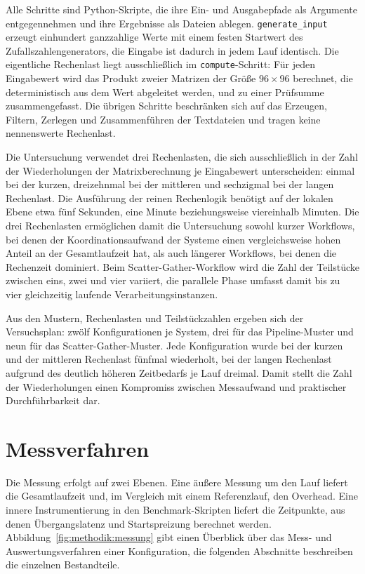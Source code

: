 Alle Schritte sind Python-Skripte, die ihre Ein- und Ausgabepfade
als Argumente entgegennehmen und ihre Ergebnisse als Dateien
ablegen. \texttt{generate\_input} erzeugt einhundert ganzzahlige
Werte mit einem festen Startwert des Zufallszahlengenerators, die
Eingabe ist dadurch in jedem Lauf identisch. Die eigentliche
Rechenlast liegt ausschließlich im \texttt{compute}-Schritt: Für
jeden Eingabewert wird das Produkt zweier Matrizen der Größe
$96 \times 96$ berechnet, die deterministisch aus dem Wert
abgeleitet werden, und zu einer Prüfsumme zusammengefasst. Die
übrigen Schritte beschränken sich auf das Erzeugen, Filtern,
Zerlegen und Zusammenführen der Textdateien und tragen keine
nennenswerte Rechenlast.

Die Untersuchung verwendet drei Rechenlasten, die sich
ausschließlich in der Zahl der Wiederholungen der Matrixberechnung
je Eingabewert unterscheiden: einmal bei der kurzen, dreizehnmal
bei der mittleren und sechzigmal bei der langen Rechenlast. Die
Ausführung der reinen Rechenlogik benötigt auf der lokalen Ebene
etwa fünf Sekunden, eine Minute beziehungsweise viereinhalb
Minuten. Die drei Rechenlasten ermöglichen damit die Untersuchung
sowohl kurzer Workflows, bei denen der Koordinationsaufwand der
Systeme einen vergleichsweise hohen Anteil an der Gesamtlaufzeit
hat, als auch längerer Workflows, bei denen die Rechenzeit
dominiert. Beim Scatter-Gather-Workflow wird die Zahl der
Teilstücke zwischen eins, zwei und vier variiert, die parallele
Phase umfasst damit bis zu vier gleichzeitig laufende
Verarbeitungsinstanzen.

Aus den Mustern, Rechenlasten und Teilstückzahlen ergeben sich der
Versuchsplan: zwölf Konfigurationen je System, drei für das Pipeline-Muster und neun für das Scatter-Gather-Muster. Jede Konfiguration wurde bei der kurzen und der mittleren Rechenlast fünfmal wiederholt, bei der langen Rechenlast aufgrund des deutlich höheren Zeitbedarfs je Lauf dreimal. Damit stellt die Zahl der Wiederholungen einen Kompromiss zwischen Messaufwand und praktischer Durchführbarkeit dar.


\section{Messverfahren}
\label{sec:methodik:messverfahren}

Die Messung erfolgt auf zwei Ebenen. Eine äußere Messung um den
Lauf liefert die Gesamtlaufzeit und, im Vergleich mit einem
Referenzlauf, den Overhead. Eine innere Instrumentierung in den
Benchmark-Skripten liefert die Zeitpunkte, aus denen Übergangslatenz
und Startspreizung berechnet werden.
Abbildung~\ref{fig:methodik:messung} gibt einen Überblick über das
Mess- und Auswertungsverfahren einer Konfiguration, die folgenden
Abschnitte beschreiben die einzelnen Bestandteile.

